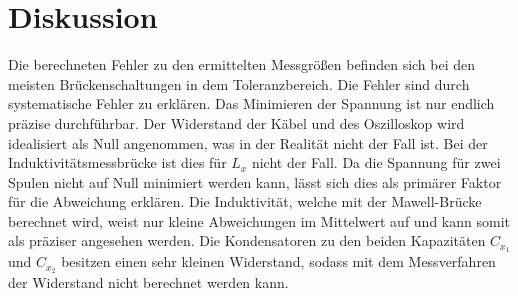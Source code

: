 \section{Diskussion}
\label{sec:Diskussion}
Die berechneten Fehler zu den ermittelten Messgrößen befinden sich bei den meisten
Brückenschaltungen in dem Toleranzbereich. Die Fehler sind durch systematische Fehler zu erklären.
Das Minimieren der Spannung ist nur endlich präzise durchführbar. Der Widerstand der Käbel und des Oszilloskop wird
idealisiert als Null angenommen, was in der Realität nicht der Fall ist.
Bei der Induktivitätsmessbrücke ist dies
für $L_x$ nicht der Fall. Da die Spannung für zwei Spulen nicht auf Null minimiert werden kann, lässt sich dies
als primärer Faktor für die Abweichung erklären. Die Induktivität, welche mit der Mawell-Brücke berechnet wird, weist
nur kleine Abweichungen im Mittelwert auf und kann somit als präziser angesehen werden. Die Kondensatoren
zu den beiden Kapazitäten $C_{x_1}$ und $C_{x_2}$ besitzen einen sehr kleinen Widerstand, sodass mit dem
Messverfahren der Widerstand nicht berechnet werden kann.

